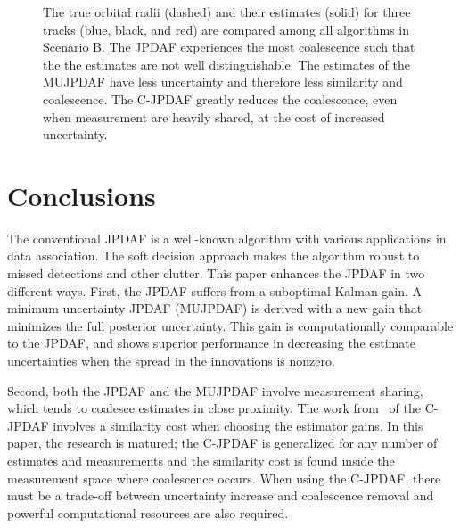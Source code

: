 \documentclass[letterpaper, 10pt, conference]{ieeeconf}
\begin{document}
\begin{figure}
\centerline{
	}
\centerline{
	}
\centerline{
	}
\caption{The true orbital radii (dashed) and their estimates (solid) for three tracks (blue, black, and red) are compared among all algorithms in Scenario B.
The JPDAF experiences the most coalescence such that the the estimates are not well distinguishable.
The estimates of the MUJPDAF have less uncertainty and therefore less similarity and coalescence.
The C-JPDAF greatly reduces the coalescence, even when measurement are heavily shared, at the cost of increased uncertainty.
}\label{fig:CompareJPDAFandOJPDAFandCJPDAF}
\end{figure}


\section{Conclusions}
\label{Conclusion}

The conventional JPDAF is a well-known algorithm with various applications in data association.
The soft decision approach makes the algorithm robust to missed detections and other clutter.
This paper enhances the JPDAF in two different ways.
First, the JPDAF suffers from a suboptimal Kalman gain.
A minimum uncertainty JPDAF (MUJPDAF) is derived with a new gain that minimizes the full posterior uncertainty.
This gain is computationally comparable to the JPDAF, and shows superior performance in decreasing the estimate uncertainties when the spread in the innovations is nonzero.

Second, both the JPDAF and the MUJPDAF involve measurement sharing, which tends to coalesce estimates in close proximity.
The work from~\cite{KauLovLee14} of the C-JPDAF involves a similarity cost when choosing the estimator gains.
In this paper, the research is matured; the C-JPDAF is generalized for any number of estimates and measurements and the similarity cost is found inside the measurement space where coalescence occurs.
When using the C-JPDAF, there must be a trade-off between uncertainty increase and coalescence removal and powerful computational resources are also required.
\end{document}
